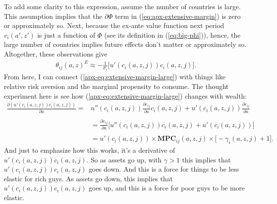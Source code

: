 \documentclass[12pt,pdftex]{article}
\begin{document}
\begin{onehalfspacing}
To add some clarity to this expression, assume the number of countries is large. This assumption implies that the $\partial \Phi$ term in (\ref{eq:apx-extensive-margin}) is zero or approximately so. Next, because the ex-ante value function next period $v_{i}(a',z')$ is just a function of $\Phi$ (see its definition in (\ref{eq:big-phi})),  hence, the large number of countries implies future effects don't matter or approximately so. Altogether, these observations give
\begin{align}
\theta_{ij}(a,z)^{E} \approx -\frac{1}{\sigma_{\epsilon}}\bigg[u'(c_{i}(a,z,j))c_{i}(a,z,j)\bigg]. \label{apx-eq:extensive-margin-large}
\end{align}
From here, I can connect (\ref{apx-eq:extensive-margin-large}) with things like relative risk aversion and the marginal propensity to consume. The thought experiment here is see how (\ref{apx-eq:extensive-margin-large}) changes with wealth:
\begin{align}
\frac{\partial (u'(c_{i}(a,z,j))c_{i}(a,z,j))}{\partial a} =& u''(c_{i}(a,z,j))\frac{\partial c_{ij}}{\partial a}c_{i}(a,z,j) + u'(c_{i}(a,z,j))\frac{\partial c_{ij}}{\partial a} \\
\nonumber \\
&= \frac{\partial c_{ij}}{\partial a}\bigg[u''(c_{i}(a,z,j))c_{i}(a,z,j) + u'(c_{i}(a,z,j)) \bigg] \\
\nonumber\\
&= u'(c_{i}(a,z,j))\times \mathbf{MPC}_{ij}(a,z,j) \times \bigg[-\gamma_{i}(a,z,j) + 1\bigg]. \label{eq:apx-elasticity-mpc}
\end{align}
And just to emphasize how this works, it's a derivative of $u'(c_{i}(a,z,j))c_{i}(a,z,j)$. So as assets go up, with $\gamma > 1$ this implies that $u'(c_{i}(a,z,j))c_{i}(a,z,j)$ goes down. And this is a force for things to be less elastic for rich guys. As assets go down, this implies that $u'(c_{i}(a,z,j))c_{i}(a,z,j)$ goes up, and this is a force for poor guys to be more elastic.


\end{onehalfspacing}
\end{document}
